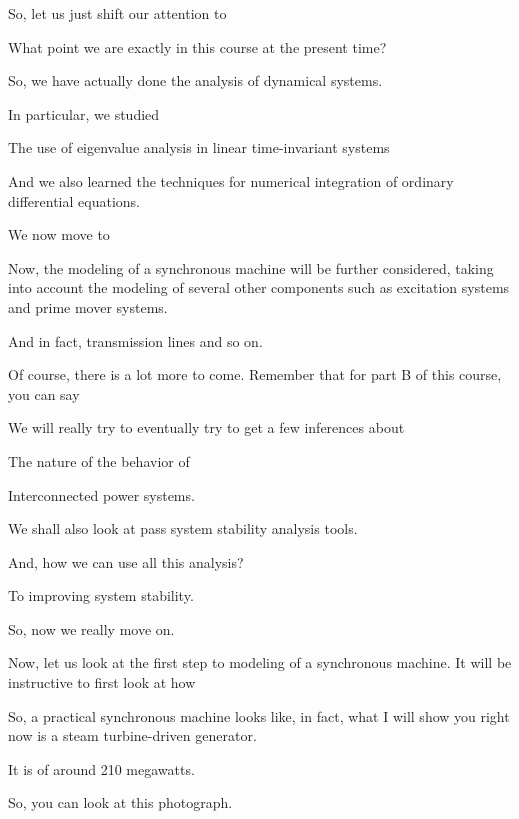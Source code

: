 \documentclass{article}
\begin{document}
So, let us just shift our attention to

What point we are exactly in this course at the present time?





So, we have actually done the analysis of dynamical systems.

In particular, we studied

The use of eigenvalue analysis in linear time-invariant systems

And we also learned the techniques for numerical integration of ordinary differential equations.

We now move to

Now, the modeling of a synchronous machine will be further considered, taking into account the modeling of several other components such as excitation systems and prime mover systems.

And in fact, transmission lines and so on.

Of course, there is a lot more to come. Remember that for part B of this course, you can say

We will really try to eventually try to get a few inferences about

The nature of the behavior of

Interconnected power systems.

We shall also look at pass system stability analysis tools.

And, how we can use all this analysis?

To improving system stability.

So, now we really move on.

Now, let us look at the first step to modeling of a synchronous machine. It will be instructive to first look at how

So, a practical synchronous machine looks like, in fact, what I will show you right now is a steam turbine-driven generator.

It is of around 210 megawatts.

So, you can look at this photograph.
\end{document}
